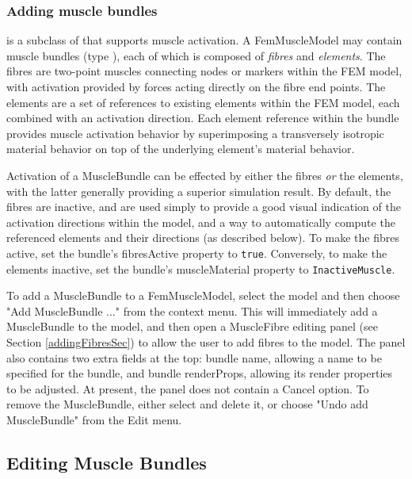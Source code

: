 \documentclass{article}
\begin{document}
\subsubsection{Adding muscle bundles}

 is a subclass of
 that supports muscle
activation. A FemMuscleModel may contain muscle bundles (type
), each of which is
composed of {\it fibres} and {\it elements}.  The fibres are two-point muscles
connecting nodes or markers within the FEM model, with activation
provided by forces acting directly on the fibre end points.  The
elements are a set of references to existing elements within the FEM
model, each combined with an activation direction. Each element
reference within the bundle provides muscle activation behavior by
superimposing a transversely isotropic material behavior on top of the
underlying element's material behavior.

Activation of a MuscleBundle can be effected by either the fibres {\it or}
the elements, with the latter generally providing a superior
simulation result. By default, the fibres are inactive, and are used
simply to provide a good visual indication of the activation
directions within the model, and a way to automatically compute the
referenced elements and their directions (as described below).  To
make the fibres active, set the bundle's {\sf fibresActive} property to
{\tt true}. Conversely, to make the elements inactive, set the bundle's
{\sf muscleMaterial} property to {\tt InactiveMuscle}.

To add a MuscleBundle to a FemMuscleModel, select the model and then
choose {\sf "Add MuscleBundle ..."} from the context menu.  This will
immediately add a MuscleBundle to the model, and then open a
MuscleFibre editing panel (see Section \ref{addingFibresSec}) to allow the user to
add fibres to the model. The panel also contains two extra fields at
the top: {\sf bundle name}, allowing a name to be specified for the
bundle, and {\sf bundle renderProps}, allowing its render properties to be
adjusted. At present, the panel does not contain a {\sf Cancel} option. To
remove the MuscleBundle, either select and delete it, or choose {\sf "Undo
add MuscleBundle"} from the {\sf Edit} menu.

\subsection{Editing Muscle Bundles}
\end{document}
